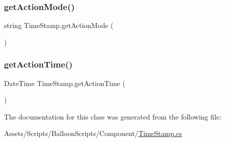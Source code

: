 \subsubsection{\texorpdfstring{get\+Action\+Mode()}{getActionMode()}}
{\footnotesize\ttfamily string Time\+Stamp.\+get\+Action\+Mode (\begin{DoxyParamCaption}{ }\end{DoxyParamCaption})\hspace{0.3cm}{\ttfamily [inline]}}

\mbox{\label{classTimeStamp_a10a14e554b1fa549ac6b19edbdd3179c}} 
\subsubsection{\texorpdfstring{get\+Action\+Time()}{getActionTime()}}
{\footnotesize\ttfamily Date\+Time Time\+Stamp.\+get\+Action\+Time (\begin{DoxyParamCaption}{ }\end{DoxyParamCaption})\hspace{0.3cm}{\ttfamily [inline]}}



The documentation for this class was generated from the following file\+:\begin{DoxyCompactItemize}
\item 
Assets/\+Scripts/\+Balloon\+Scripts/\+Component/\hyperlink{TimeStamp_8cs}{Time\+Stamp.\+cs}\end{DoxyCompactItemize}
